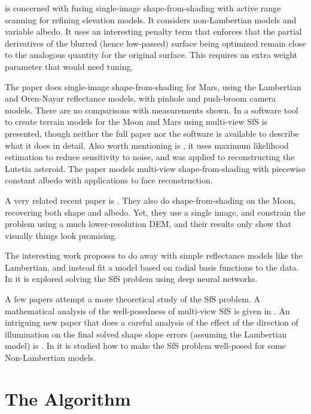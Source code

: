 \documentclass[12pt,oneside]{article}
\begin{document}
\cite{herbort2011reconstruction} is concerned with fusing single-image
shape-from-shading with active range scanning for refining elevation
models. It considers non-Lambertian models and variable albedo. It uses
an interesting penalty term that enforces that the partial derivatives
of the blurred (hence low-passed) surface being optimized remain close
to the analogous quantity for the original surface.  This requires an
extra weight parameter that would need tuning.

The paper \cite{o2012new} does single-image shape-from-shading for Mars,
using the Lambertian and Oren-Nayar reflectance models, with pinhole
and push-broom camera models. There are no comparisons with measurements
shown. In \cite{tyler2014merged} a software tool to create terrain models for
the Moon and Mars using multi-view SfS is presented, though neither the
full paper nor the software is available to describe what it does in
detail. Also worth mentioning is \cite{capanna2013three}, it uses
maximum likelihood estimation to reduce sensitivity to noise, and was
applied to reconstructing the Lutetia asteroid. The paper
\cite{samaras2000variable} models multi-view shape-from-shading with
piecewise constant albedo with applications to face reconstruction.

A very related recent paper is \cite{wu2016shape}. They also do
shape-from-shading on the Moon, recovering both shape and albedo. Yet,
they use a single image, and constrain the problem using a much
lower-resolution DEM, and their results only show that visually things
look promising.

The interesting work \cite{yang2017new} proposes to do away with 
simple reflectance models like the Lambertian, and instead fit a 
model based on radial basis functions to the data. In \cite{yang2017shape}
it is explored solving the SfS problem using deep neural networks.

A few papers attempt a more theoretical study of the SfS problem. A
mathematical analysis of the well-posedness of multi-view SfS is given
in \cite{jin20083}. An intriguing new paper that does a careful analysis
of the effect of the direction of illumination on the final solved shape
slope errors (assuming the Lambertian model) is
\cite{liu2018effects}. In \cite{camilli2017unified} it is studied how to
make the SfS problem well-posed for some Non-Lambertian models.

\section{The Algorithm}
\end{document}
